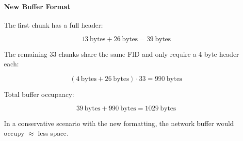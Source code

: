 \paragraph{New Buffer Format}

The first chunk has a full header:

\[
13~\text{bytes} + 26~\text{bytes} = 39~\text{bytes}
\]

The remaining 33 chunks share the same \ac{FID} and only require a 4-byte header each:

\[
(4~\text{bytes} + 26~\text{bytes}) \cdot 33 = 990~\text{bytes}
\]

Total buffer occupancy:

\[
39~\text{bytes} + 990~\text{bytes} = 1029~\text{bytes}
\]

In a conservative scenario with the new formatting, the network buffer would occupy $\approx$ less space.